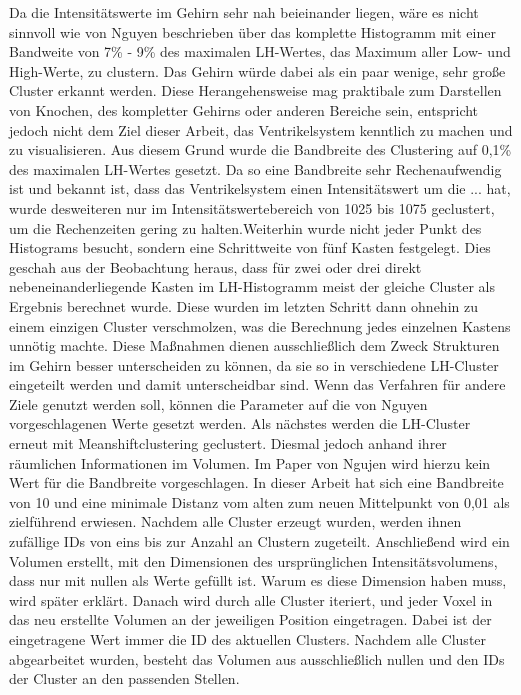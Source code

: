Da die Intensitätswerte im Gehirn sehr nah beieinander liegen, wäre es nicht sinnvoll wie von Nguyen beschrieben über das komplette Histogramm mit einer Bandweite von 7\% - 9\% des maximalen LH-Wertes, das Maximum aller Low- und High-Werte, zu clustern. Das Gehirn würde dabei als ein paar wenige, sehr große Cluster erkannt werden. Diese Herangehensweise mag praktibale zum Darstellen von Knochen, des kompletter Gehirns oder anderen Bereiche sein, entspricht jedoch nicht dem Ziel dieser Arbeit, das Ventrikelsystem kenntlich zu machen und zu visualisieren. Aus diesem Grund wurde die Bandbreite des Clustering auf 0,1\% des maximalen LH-Wertes gesetzt.
\newline
Da so eine Bandbreite sehr Rechenaufwendig ist und bekannt ist, dass das Ventrikelsystem einen Intensitätswert um die ... hat, wurde desweiteren nur im Intensitätswertebereich von 1025 bis 1075 geclustert, um die Rechenzeiten gering zu halten.Weiterhin wurde nicht jeder Punkt des Histograms besucht, sondern eine Schrittweite von fünf Kasten festgelegt. Dies geschah aus der Beobachtung heraus, dass für zwei oder drei direkt nebeneinanderliegende Kasten im LH-Histogramm meist der gleiche Cluster als Ergebnis berechnet wurde. Diese wurden im letzten Schritt dann ohnehin zu einem einzigen Cluster verschmolzen, was die Berechnung jedes einzelnen Kastens unnötig machte. Diese Maßnahmen dienen ausschließlich dem Zweck Strukturen im Gehirn besser unterscheiden zu können, da sie so in verschiedene LH-Cluster eingeteilt werden und damit unterscheidbar sind. Wenn das Verfahren für andere Ziele genutzt werden soll, können die Parameter auf die von Nguyen vorgeschlagenen Werte gesetzt werden. 
\newline
Als nächstes werden die LH-Cluster erneut mit Meanshiftclustering geclustert. Diesmal jedoch anhand ihrer räumlichen Informationen im Volumen. Im Paper von Ngujen wird hierzu kein Wert für die Bandbreite vorgeschlagen. In dieser Arbeit hat sich eine Bandbreite von 10  und eine minimale Distanz vom alten zum neuen Mittelpunkt von 0,01 als zielführend erwiesen.
\newline
Nachdem alle Cluster erzeugt wurden, werden ihnen zufällige IDs von eins bis zur Anzahl an Clustern zugeteilt. Anschließend wird ein Volumen erstellt, mit den Dimensionen des ursprünglichen Intensitätsvolumens, dass nur mit nullen als Werte gefüllt ist. Warum es diese Dimension haben muss, wird später erklärt. Danach wird durch alle Cluster iteriert, und jeder Voxel in das neu erstellte Volumen an der jeweiligen Position eingetragen. Dabei ist der eingetragene Wert immer die  ID des aktuellen Clusters. Nachdem alle Cluster abgearbeitet wurden, besteht das Volumen aus ausschließlich nullen und den IDs der Cluster an den passenden Stellen.
